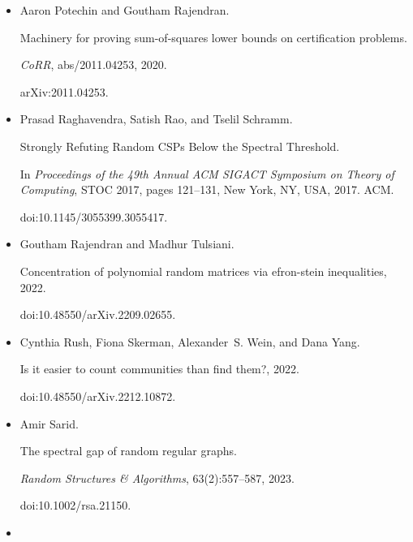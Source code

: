 \begin{itemize}
\item[] 
[39]

Aaron Potechin and Goutham Rajendran.


Machinery for proving sum-of-squares lower bounds on certification
problems.


\emph{CoRR}, abs/2011.04253, 2020.


arXiv:2011.04253.





\item[] 
[40]

Prasad Raghavendra, Satish Rao, and Tselil Schramm.


Strongly Refuting Random CSPs Below the Spectral Threshold.


In \emph{Proceedings of the 49th Annual ACM SIGACT Symposium on Theory
of Computing}, STOC 2017, pages 121–131, New York, NY, USA, 2017. ACM.


doi:10.1145/3055399.3055417.





\item[] 
[41]

Goutham Rajendran and Madhur Tulsiani.


Concentration of polynomial random matrices via efron-stein
inequalities, 2022.


doi:10.48550/arXiv.2209.02655.





\item[] 
[42]

Cynthia Rush, Fiona Skerman, Alexander S. Wein, and Dana Yang.


Is it easier to count communities than find them?, 2022.


doi:10.48550/arXiv.2212.10872.





\item[] 
[43]

Amir Sarid.


The spectral gap of random regular graphs.


\emph{Random Structures \& Algorithms}, 63(2):557–587, 2023.


doi:10.1002/rsa.21150.





\item[] 
[44]


\end{itemize}
